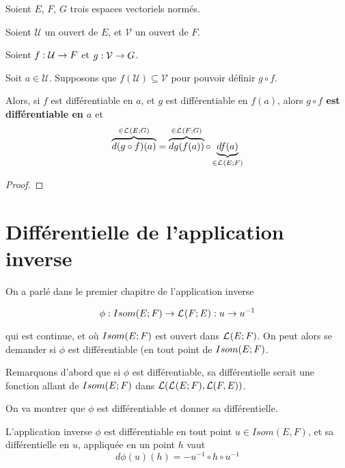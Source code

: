 \begin{theorem} 
	\label{theorem:chain_rule}
	Soient $E$, $F$, $G$ trois espaces vectoriels normés.

	Soient $\mathcal{U}$ un ouvert de $E$, et $\mathcal{V}$ un ouvert de $F$.

	Soient $f : \mathcal{U} \rightarrow F$ et
	$g : \mathcal{V} \rightarrow G$.

	Soit $a \in \mathcal{U}$.
	Supposons que $f(\mathcal{U}) \subseteq \mathcal{V}$ pour pouvoir définir $g
	\circ f$.

	Alors, si $f$ est différentiable en $a$, et $g$ est différentiable en
	$f(a)$, alors \textbf{$g \circ f$ est différentiable en $a$} et
	\begin{equation*}
		\overbrace{d(g \circ f)(a)}^{\in \mathcal{L}_{}(E; G)} =
		\overbrace{dg(f(a))}^{\in \mathcal{L}_{}(F; G)} \circ
		\underbrace{df(a)}_{\in \mathcal{L}_{}(E; F)}
	\end{equation*}
\end{theorem}

\ifdefined\outputproof
\begin{proof}

\end{proof}
\fi

\section{Différentielle de l'application inverse}

On a parlé dans le premier chapitre de l'application inverse

\begin{equation*}
	\phi : Isom(E; F) \rightarrow \mathcal{L}_{}(F; E) : u \rightarrow u^{-1}
\end{equation*}

qui est continue, et où $Isom(E; F)$ est ouvert dans
$\mathcal{L}_{}(E; F)$.
On peut alors se demander si $\phi$ est différentiable (en tout point de
$Isom(E; F)$.

Remarquons d'abord que si $\phi$ est différentiable, sa différentielle serait
une fonction allant de $Isom(E; F)$ dans $\mathcal{L}(\mathcal{L}_{}(E; F), \mathcal{L}(F,
E))$.

On va montrer que $\phi$ est différentiable et donner sa différentielle.

\begin{theorem}
\label{differential_inverse_application}
	L'application inverse $\phi$ est différentiable en tout point $u \in Isom(E,
	F)$, et sa différentielle en $u$, appliquée en un point $h$ vaut
	\begin{equation*}
		d\phi(u)(h) = -u^{-1} \circ h \circ u^{-1}
	\end{equation*}
\end{theorem}

